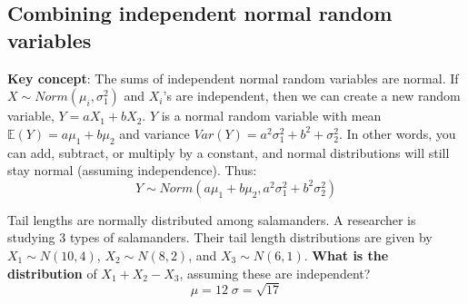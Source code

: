 \documentclass[titlepage, 12pt, leqno]{article}
\begin{document}
\subsection{Combining independent normal random variables}
\textbf{Key concept}: The sums of independent normal random variables are normal.
If $X \sim Norm(\mu_i, \sigma_1^2)$ and $X_i$'s are independent, then we can
create a new random variable, $Y = aX_1 + bX_2$. $Y$ is a normal random variable
with mean $ \mathbb{E}(Y) = a\mu_1 + b\mu_2$ and variance $Var(Y) = 
a^2\sigma_1^2 + b^2+\sigma_2^2$. In other words, you can add, subtract, or
multiply by a constant, and normal distributions will still stay normal 
(assuming independence). Thus:
\[
    Y \sim Norm(a\mu_1 + b\mu_2, a^2\sigma_1^2 + b^2\sigma_2^2)
\]
\begin{ex}
    Tail lengths are normally distributed among salamanders. A researcher is 
    studying 3 types of salamanders. Their tail length distributions are given
    by $X_1 \sim N(10,4)$, $X_2 \sim N(8,2)$, and $X_3 \sim N(6,1)$.
    \textbf{What is the distribution} of $X_1 + X_2 - X_3$, assuming these 
    are independent?
    \[
        \boxed{\mu = 12 \; \sigma = \sqrt{17}} 
    \]
\end{ex}
\end{document}
